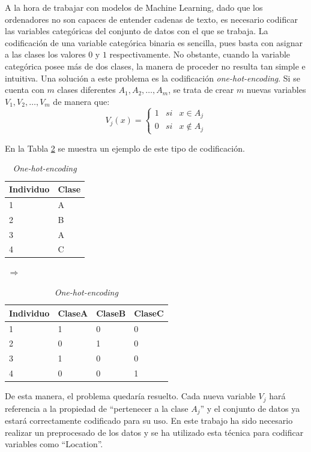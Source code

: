 \documentclass[12pt,twoside]{article}
\begin{document}
A la hora de trabajar con modelos de Machine Learning, dado que los ordenadores no son capaces de entender cadenas de texto, es necesario codificar las variables categóricas del conjunto de datos con el que se trabaja. La codificación de una variable categórica binaria es sencilla, pues basta con asignar a las clases los valores $0$ y $1$ respectivamente. No obstante, cuando la variable categórica posee más de dos clases, la manera de proceder no resulta tan simple e intuitiva. Una solución a este problema es la codificación \textit{one-hot-encoding}. Si se cuenta con $m$ clases diferentes $A_1, A_2, \dots, A_m$, se trata de crear $m$ nuevas variables $V_1, V_2, \dots, V_m$ de manera que:
\begin{equation*}
V_j(x) = 
\left\{
\begin{array}{ccc}
1 & si & x \in A_j \\
0 & si & x \not\in A_j
\end{array}
\right.
\end{equation*}

En la Tabla \ref{tab:CatB_01} se muestra un ejemplo de este tipo de codificación.
\begin{table}[h]
\centering
\begin{tabular}{|l|l|}
\hline
Individuo & Clase \\ \hline
1         & A     \\ \hline
2         & B     \\ \hline
3         & A     \\ \hline
4         & C     \\ \hline
\end{tabular}
$\, \, \Rightarrow \, \,$
\begin{tabular}{|l|l|l|l|}
\hline
Individuo & ClaseA & ClaseB & ClaseC \\ \hline
1         & 1 & 0 & 0     \\ \hline
2         & 0 & 1 & 0     \\ \hline
3         & 1 & 0 & 0     \\ \hline
4         & 0 & 0 & 1     \\ \hline
\end{tabular}
\caption{\textit{One-hot-encoding}}
\label{tab:CatB_01}
\end{table}

De esta manera, el problema quedaría resuelto. Cada nueva variable $V_j$ hará referencia a la propiedad de ``pertenecer a la clase $A_j$'' y el conjunto de datos ya estará correctamente codificado para su uso. En este trabajo ha sido necesario realizar un preprocesado de los datos y se ha utilizado esta técnica para codificar variables como ``Location''.
\end{document}
